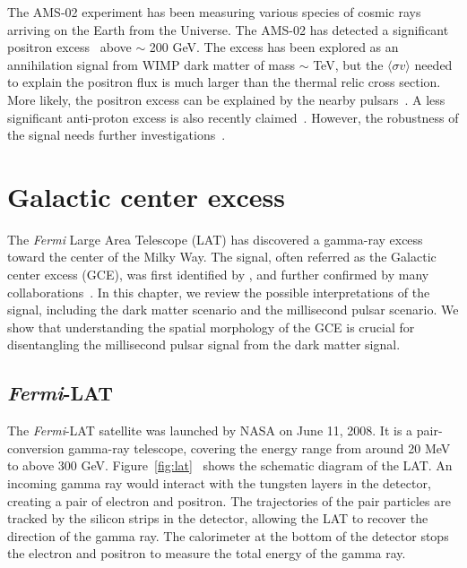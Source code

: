 \documentclass[doublespace,nopageskip]{VTthesis} %
\newcommand{\sigmav}{\langle\sigma v\rangle}
\begin{document}
The AMS-02 experiment has been measuring various species of cosmic rays arriving on the Earth from the Universe. The AMS-02 has detected a significant positron excess~\cite{2014PhRvL.113l1101A} above $\sim$ 200 GeV. The excess has been explored as an annihilation signal from WIMP dark matter of mass $\sim$ TeV, but the $\sigmav$ needed to explain the positron flux is much larger than the thermal relic cross section. More likely, the positron excess can be explained by the nearby pulsars~\cite{2009JCAP...01..025H}. A less significant anti-proton excess is also recently claimed~\cite{2017PhRvL.118s1101C}. However, the robustness of the signal needs further investigations~\cite{2019PhRvD..99j3026C, 2021arXiv210714606H}.


\chapter{Galactic center excess} \label{ch:GCE}

The \emph{Fermi} Large Area Telescope (LAT) has discovered a gamma-ray excess toward the center of the Milky Way. The signal, often referred as the Galactic center excess (GCE), was first identified by \citet{2009arXiv0910.2998G}, and further confirmed by many collaborations~\cite{2009arXiv0912.3828V,2011PhLB..697..412H,2012PhRvD..86h3511A,2013PhRvD..88h3521G,2014PhRvD..89f3515M,2013PDU.....2..118H,2014PhRvD..90b3526A,2016PDU....12....1D,2015JCAP...03..038C,2015PhRvD..91l3010Z,2016ApJ...819...44A,2017ApJ...840...43A}. In this chapter, we review the possible interpretations of the signal, including the dark matter scenario and the millisecond pulsar scenario. We show that understanding the spatial morphology of the GCE is crucial for disentangling the millisecond pulsar signal from the dark matter signal.

\section{\textit{Fermi}-LAT}

The \textit{Fermi}-LAT satellite was launched by NASA on June 11, 2008. It is a pair-conversion gamma-ray telescope, covering the energy range from around 20 MeV to above 300 GeV. Figure~\ref{fig:lat}~\cite{2009ApJ...697.1071A} shows the schematic diagram of the LAT. An incoming gamma ray would interact with the tungsten layers in the detector, creating a pair of electron and positron. The trajectories of the pair particles are tracked by the silicon strips in the detector, allowing the LAT to recover the direction of the gamma ray. The calorimeter at the bottom of the detector stops the electron and positron to measure the total energy of the gamma ray.
\end{document}

